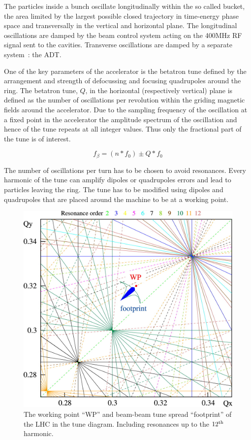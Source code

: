The particles inside a bunch oscillate longitudinally within the so called bucket, the area limited by the largest possible closed trajectory in time-energy phase space and transversally in the vertical and horizontal plane. The longitudinal oscillations are damped by the beam control system acting on the 400MHz RF signal sent to the cavities. Transverse oscillations are damped by a separate system~: the \gls{ADT}\cite{Zhabitsky:1141925,Benews11}.

One of the key parameters of the accelerator is the betatron tune defined by the arrangement and strength of defocussing and focusing quadrupoles around the ring. The betatron tune, $Q$, in the horizontal (respectively vertical) plane is defined as the number of oscillations per revolution within the griding magnetic fields around the accelerator. Due to the sampling frequency of the oscillation at a fixed point in the accelerator the amplitude spectrum of the oscillation and hence of the tune repeats at all integer values. Thus only the fractional part of the tune is of interest.

$$ f_{\beta} = (n * f_{0}) \pm Q * f_{0} $$

The number of oscillations per turn has to be chosen to avoid resonances. Every harmonic of the tune can amplify dipoles or quadrupoles errors and lead to particles leaving the ring. The tune has to be modified using dipoles and quadrupoles that are placed around the machine to be at a working point.

\begin{figure}[H]
\centering
\caption{The working point ``WP'' and beam-beam tune spread ``footprint'' of the LHC in the tune diagram. Including resonances up to the $12^{\rm {th}}$ harmonic.}
\includegraphics[scale=1.25]{lhc_working_point.jpeg}
\end{figure}

